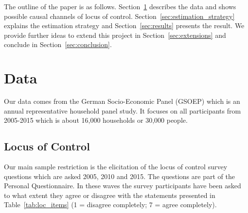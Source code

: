 \documentclass[12pt, a4paper, fleqn, parskip]{scrartcl}
\begin{document}
The outline of the paper is as follows. Section~\ref{sec:data} describes the
data and shows possible causal channels of locus of control.
Section~\ref{sec:estimation_strategy} explains the estimation strategy and
Section~\ref{sec:results} presents the result. We provide further ideas to
extend this project in Section~\ref{sec:extensions} and conclude in
Section~\ref{sec:conclusion}.

\section{Data}
\label{sec:data}

Our data comes from the German Socio-Economic Panel (GSOEP)  \citep{gsoep2017}
which is an annual representative household panel study. It focuses on all
participants from 2005-2015 which is about 16,000 households or 30,000 people.

\subsection{Locus of Control} %
\label{sub:locus_of_control}

Our main sample restriction is the elicitation of the locus of control survey
questions which are asked 2005, 2010 and 2015. The questions are part of the
Personal Questionnaire. In these waves the survey participants have been asked
to what extent they agree or disagree with the statements presented in
Table~\ref{tab:loc_items} (1 = disagree completely; 7 = agree completely).
\end{document}

